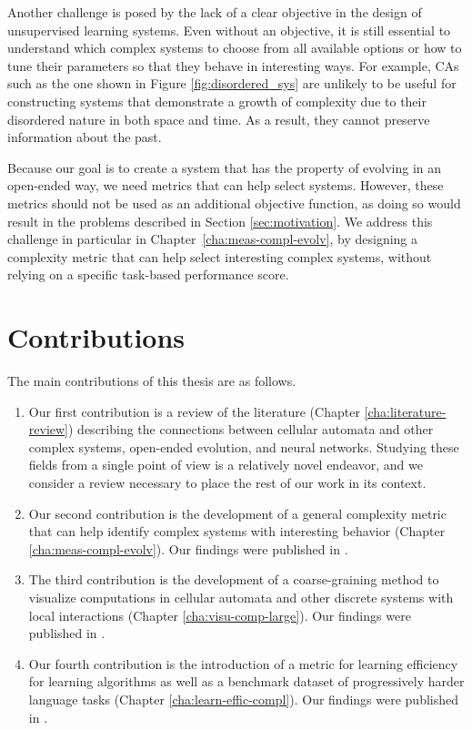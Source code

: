 Another challenge is posed by the lack of a clear objective in the design of
unsupervised learning systems. Even without an objective, it is still essential
to understand which complex systems to choose from all available options or how
to tune their parameters so that they behave in interesting ways. For example,
\acp{CA} such as the one shown in Figure \ref{fig:disordered_sys} are unlikely 
to be useful for constructing systems that demonstrate a growth of complexity 
due to their disordered nature in both space and time. As a result, they cannot
preserve information about the past.

Because our goal is to create a system that has the property of evolving in an
open-ended way, we need metrics that can help select systems. However, these metrics 
should not be used as an additional objective function, as doing so would result 
in the problems described in Section \ref{sec:motivation}. We address this 
challenge in particular
in Chapter~\ref{cha:meas-compl-evolv}, by designing a complexity metric that can
help select interesting complex systems, without relying on a specific
task-based performance score.

\section{Contributions}

The main contributions of this thesis are as follows.
\begin{enumerate}
  \item Our first contribution is a review of the literature (Chapter \ref{cha:literature-review})
        describing the connections between cellular automata
        and other complex systems, open-ended evolution, and neural networks.
        Studying these fields from a single point of view is a relatively novel
        endeavor, and we consider a review necessary to place the rest of our
        work in its context.

  \item Our second contribution is the development of a general complexity metric that can help identify
        complex systems with interesting behavior (Chapter \ref{cha:meas-compl-evolv}). Our findings were published in \cite{cisnerosEvolvingStructuresComplex2019}.

  \item The third contribution is the development of a coarse-graining method to visualize computations in
        cellular automata and other discrete systems with local interactions (Chapter \ref{cha:visu-comp-large}). Our findings were published in \cite{cisnerosVisualizingComputationLargescale2020}.

  \item Our fourth contribution is the introduction of a metric for learning efficiency for learning
        algorithms as well as a benchmark dataset of progressively harder
        language tasks (Chapter \ref{cha:learn-effic-compl}). Our findings were published in \cite{cisnerosBenchmarkingLearningEfficiency2022}.
\end{enumerate}

